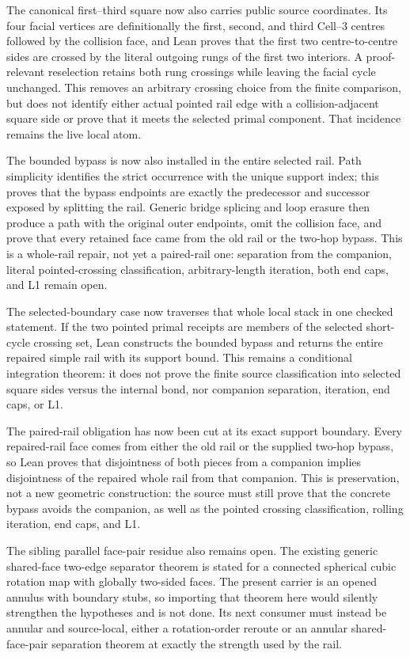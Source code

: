 \documentclass[11pt]{article}
\theoremstyle{definition}
\begin{document}
The canonical first--third square now also carries public source coordinates.
Its four facial vertices are definitionally the first, second, and third
Cell--3 centres followed by the collision face, and Lean proves that the first
two centre-to-centre sides are crossed by the literal outgoing rungs of the
first two interiors.  A proof-relevant reselection retains both rung crossings
while leaving the facial cycle unchanged.  This removes an arbitrary crossing
choice from the finite comparison, but does not identify either actual pointed
rail edge with a collision-adjacent square side or prove that it meets the
selected primal component.  That incidence remains the live local atom.

The bounded bypass is now also installed in the entire selected rail.  Path
simplicity identifies the strict occurrence with the unique support index;
this proves that the bypass endpoints are exactly the predecessor and
successor exposed by splitting the rail.  Generic bridge splicing and loop
erasure then produce a path with the original outer endpoints, omit the
collision face, and prove that every retained face came from the old rail or
the two-hop bypass.  This is a whole-rail repair, not yet a paired-rail one:
separation from the companion, literal pointed-crossing classification,
arbitrary-length iteration, both end caps, and L1 remain open.

The selected-boundary case now traverses that whole local stack in one checked
statement.  If the two pointed primal receipts are members of the selected
short-cycle crossing set, Lean constructs the bounded bypass and returns the
entire repaired simple rail with its support bound.  This remains a conditional
integration theorem: it does not prove the finite source classification into
selected square sides versus the internal bond, nor companion separation,
iteration, end caps, or L1.

The paired-rail obligation has now been cut at its exact support boundary.
Every repaired-rail face comes from either the old rail or the supplied
two-hop bypass, so Lean proves that disjointness of both pieces from a
companion implies disjointness of the repaired whole rail from that companion.
This is preservation, not a new geometric construction: the source must still
prove that the concrete bypass avoids the companion, as well as the pointed
crossing classification, rolling iteration, end caps, and L1.

The sibling parallel face-pair residue also remains open.  The existing generic
shared-face two-edge separator theorem is stated for a connected spherical
cubic rotation map with globally two-sided faces.  The present carrier is an
opened annulus with boundary stubs, so importing that theorem here would silently
strengthen the hypotheses and is not done.  Its next consumer must instead be
annular and source-local, either a rotation-order reroute or an annular
shared-face-pair separation theorem at exactly the strength used by the rail.
\end{document}

